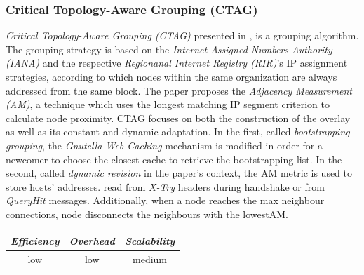 \subsubsection{Critical Topology-Aware Grouping (CTAG)}
\emph{Critical Topology-Aware Grouping (CTAG)} presented in
\cite{zhao_ctag_2006}, is a grouping algorithm. The grouping strategy is based
on the \emph{Internet Assigned Numbers Authority (IANA)} and the respective
\emph{Regionanal Internet Registry (RIR)}'s IP assignment strategies, according
to which nodes within the same organization are always addressed from the same
block. The paper proposes the \emph{Adjacency Measurement (AM)}, a technique
which uses the longest matching IP segment criterion to calculate node
proximity. CTAG focuses on both the construction of the overlay as well as its
constant and dynamic adaptation. In the first, called \emph{bootstrapping
grouping}, the \emph{Gnutella Web Caching} mechanism is modified in order for a
newcomer to choose the closest cache to retrieve the bootstrapping list. In the
second, called \emph{dynamic revision} in the paper's context, the AM metric is
used to store hosts' addresses. read from \emph{X-Try} headers during handshake
or from \emph{QueryHit} messages. Additionally, when a node reaches the max
neighbour connections, node disconnects the neighbours with the lowestAM.

\begin{center}
\begin{tabular}{ccc}
\emph{Efficiency} & \emph{Overhead} & \emph{Scalability} \\
\hline
low &
low &
medium
\end{tabular}
\end{center}



